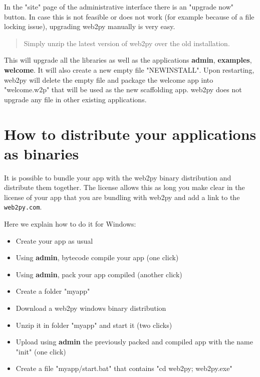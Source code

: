 \documentclass[justified,sixbynine,notoc]{tufte-book}
\def\ft{\small\tt}
\def\inxx#1{\index{#1}}
\begin{document}
\begin{fullwidth}
\inxx{upgrades}

In the "site" page of the administrative interface there is an "upgrade now" button. In case this is not feasible or does not work (for example because of a file locking issue), upgrading web2py manually is very easy.

\begin{quote}Simply unzip the latest version of web2py over the old installation.\end{quote}
This will upgrade all the libraries as well as the applications {\bf admin}, {\bf examples}, {\bf welcome}. It will also create a new empty file "NEWINSTALL". Upon restarting, web2py will delete the empty file and package the welcome app into "welcome.w2p" that will be used as the new scaffolding app.
\noindent web2py does not upgrade any file in other existing applications.

\goodbreak\section{How to distribute your applications as binaries}

It is possible to bundle your app with the web2py binary distribution and distribute them together. The license allows this as long you make clear in the license of your app that you are bundling with web2py and add a link to the {\ft web2py.com}.

Here we explain how to do it for Windows:

\begin{itemize}
\item Create your app as usual

\item Using {\bf admin}, bytecode compile your app (one click)

\item Using {\bf admin}, pack your app compiled (another click)

\item Create a folder "myapp"

\item Download a web2py windows binary distribution

\item Unzip it in folder "myapp" and start it (two clicks)

\item Upload using {\bf admin} the previously packed and compiled app with the name "init" (one click)

\item Create a file "myapp/start.bat" that contains "cd web2py; web2py.exe"


\end{itemize}
\end{fullwidth}
\end{document}
